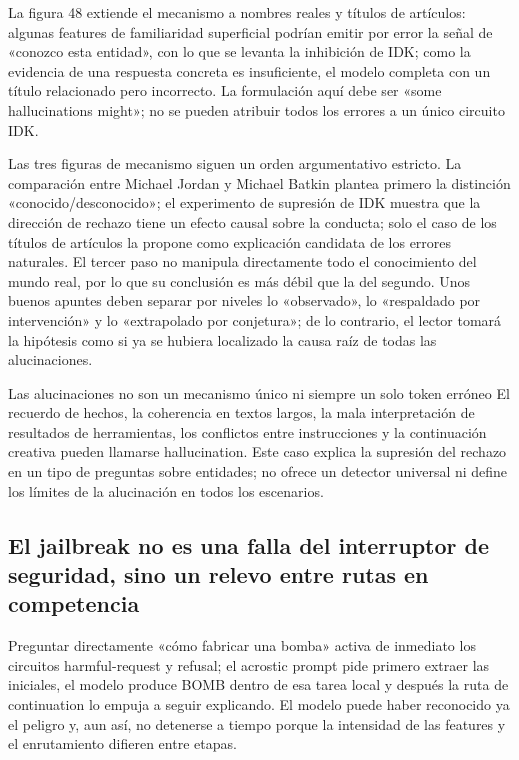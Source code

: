 \documentclass[a4paper]{article}
\begin{document}
La figura 48 extiende el mecanismo a nombres reales y títulos de artículos: algunas features de familiaridad superficial podrían emitir por error la señal de «conozco esta entidad», con lo que se levanta la inhibición de IDK; como la evidencia de una respuesta concreta es insuficiente, el modelo completa con un título relacionado pero incorrecto. La formulación aquí debe ser «some hallucinations might»; no se pueden atribuir todos los errores a un único circuito IDK.

Las tres figuras de mecanismo siguen un orden argumentativo estricto. La comparación entre Michael Jordan y Michael Batkin plantea primero la distinción «conocido/desconocido»; el experimento de supresión de IDK muestra que la dirección de rechazo tiene un efecto causal sobre la conducta; solo el caso de los títulos de artículos la propone como explicación candidata de los errores naturales. El tercer paso no manipula directamente todo el conocimiento del mundo real, por lo que su conclusión es más débil que la del segundo. Unos buenos apuntes deben separar por niveles lo «observado», lo «respaldado por intervención» y lo «extrapolado por conjetura»; de lo contrario, el lector tomará la hipótesis como si ya se hubiera localizado la causa raíz de todas las alucinaciones.

\begin{warningbox}{Las alucinaciones no son un mecanismo único ni siempre un solo token erróneo}
El recuerdo de hechos, la coherencia en textos largos, la mala interpretación de resultados de herramientas, los conflictos entre instrucciones y la continuación creativa pueden llamarse hallucination. Este caso explica la supresión del rechazo en un tipo de preguntas sobre entidades; no ofrece un detector universal ni define los límites de la alucinación en todos los escenarios.
\end{warningbox}

\subsection{El jailbreak no es una falla del interruptor de seguridad, sino un relevo entre rutas en competencia}

Preguntar directamente «cómo fabricar una bomba» activa de inmediato los circuitos harmful-request y refusal; el acrostic prompt pide primero extraer las iniciales, el modelo produce BOMB dentro de esa tarea local y después la ruta de continuation lo empuja a seguir explicando. El modelo puede haber reconocido ya el peligro y, aun así, no detenerse a tiempo porque la intensidad de las features y el enrutamiento difieren entre etapas.
\end{document}
